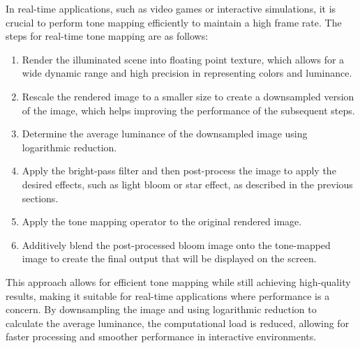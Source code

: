 In real-time applications, such as video games or interactive simulations, it is crucial to perform tone mapping efficiently to maintain a high frame rate. The steps for real-time tone mapping are as follows:
\begin{enumerate}
    \item Render the illuminated scene into floating point texture, which allows for a wide dynamic range and high precision in representing colors and luminance.
    \item Rescale the rendered image to a smaller size to create a downsampled version of the image, which helps improving the performance of the subsequent steps.
    \item Determine the average luminance of the downsampled image using logarithmic reduction.
    \item Apply the bright-pass filter and then post-process the image to apply the desired effects, such as light bloom or star effect, as described in the previous sections.
    \item Apply the tone mapping operator to the original rendered image.
    \item Additively blend the post-processed bloom image onto the tone-mapped image to create the final output that will be displayed on the screen.
\end{enumerate}

This approach allows for efficient tone mapping while still achieving high-quality results, making it suitable for real-time applications where performance is a concern. By downsampling the image and using logarithmic reduction to calculate the average luminance, the computational load is reduced, allowing for faster processing and smoother performance in interactive environments.